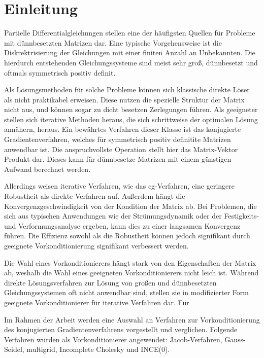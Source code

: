 \section{Einleitung}
Partielle Differentialgleichungen stellen eine der h\"aufigsten Quellen f\"ur Probleme mit d\"unnbesetzten Matrizen dar. Eine typische Vorgehensweise ist die Diskrektrisierung der Gleichungen mit einer finiten Anzahl an Unbekannten. Die hierdurch entstehenden Gleichungssysteme sind meist sehr gro\ss, d\"unnbesetzt und oftmals symmetrisch positiv definit.\cite{saad03:IMS}


Als L\"osungsmethoden f\"ur solche Probleme k\"onnen sich klassische direkte L\"oser  als nicht praktikabel erweisen. Diese nutzen die spezielle Struktur der Matrix nicht aus, und k\"onnen sogar zu dicht besetzen Zerlegungen f\"uhren. 
Als geeigneter stellen sich iterative Methoden heraus, die sich schrittweise der optimalen L\"osung ann\"ahern, heraus. Ein bew\"ahrtes Verfahren dieser Klasse ist das konjugierte Gradientenverfahren, welches für  symmetrisch positiv definitite Matrizen anwendbar ist. Die anspruchvollste Operation stellt hier das Matrix-Vektor Produkt dar. Dieses kann f\"ur d\"unnbesetze Matrizen mit einem g\"unstigen Aufwand berechnet werden. \cite{GoluVanl96}

Allerdings weisen iterative Verfahren, wie das cg-Verfahren, eine geringere Robustheit als direkte Verfahren auf. Au{\ss}erdem h\"angt die Konvergenzgeschwindigkeit von der Kondition der Matrix ab. Bei Problemen, die sich aus typischen Anwendungen wie der Str\"umungsdynamik oder der Festigkeits- und Verformungsanalyse ergeben, kann dies zu einer langsamen Konvergenz führen.
Die Effizienz sowohl als die Robustheit k\"onnen jedoch signifikant durch geeignete Vorkonditionierung signifikant verbessert werden. \cite{saad03:IMS}

Die Wahl eines Vorkonditionierers hängt stark von den Eigenschaften der Matrix ab, weshalb die Wahl eines geeigneten Vorkonditionierers nicht leich ist. W\"ahrend direkte L\"osungsverfahren zur L\"osung von großen und d\"unnbesetzten Gleichungssystemen oft nicht anwendbar sind, stellen sie in modifizierter Form geeignete Vorkonditionierer für iterative Verfahren dar. Für

Im Rahmen der Arbeit werden eine Auswahl an Verfahren zur Vorkonditionierung des konjugierten Gradientenverfahrens vorgestellt und verglichen. Folgende Verfahren wurden als Vorkonditionierer angewendet: Jacob-Verfahren, Gauss-Seidel, multigrid, Incomplete Cholesky und  INCE(0).

